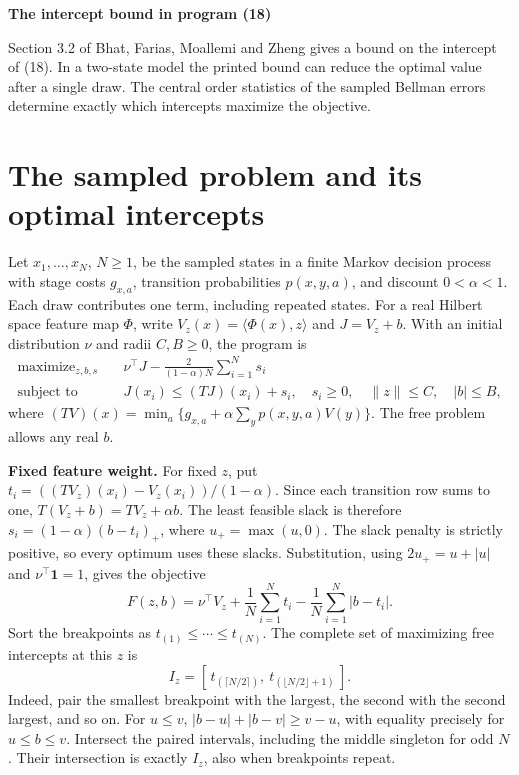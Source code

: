 \documentclass[12pt,a4paper]{article}
\newcommand{\lead}[1]{\par\smallskip\noindent\textbf{#1}\enspace}
\begin{document}
{\LARGE\bfseries The intercept bound in program (18)\par}
\medskip
Section 3.2 of Bhat, Farias, Moallemi and Zheng gives a bound on the
intercept of (18). In a two-state model the printed bound can reduce the
optimal value after a single draw. The central order statistics of the sampled Bellman
errors determine exactly which intercepts maximize the objective.

\section*{The sampled problem and its optimal intercepts}
Let \(x_1,\ldots,x_N\), \(N\ge1\), be the sampled states in a finite Markov
decision process with stage costs \(g_{x,a}\), transition probabilities
\(p(x,y,a)\), and discount \(0<\alpha<1\). Each draw contributes one
term, including repeated states. For a real Hilbert space feature map
\(\Phi\), write \(V_z(x)=\langle\Phi(x),z\rangle\) and \(J=V_z+b\).
With an initial distribution \(\nu\) and radii \(C,B\ge0\), the program is
\begin{equation}
\begin{aligned}
 \operatorname{maximize}_{z,b,s}\quad &\nu^\top J-\frac{2}{(1-\alpha)N}\sum_{i=1}^N s_i\\
 \text{subject to}\quad &J(x_i)\le (TJ)(x_i)+s_i,\quad s_i\ge0,\quad
 \|z\|\le C,\quad |b|\le B,
\end{aligned}\tag{18}
\end{equation}
where \((TV)(x)=\min_a\{g_{x,a}+\alpha\sum_y p(x,y,a)V(y)\}\).
The free problem allows any real \(b\).

\lead{Fixed feature weight.}
For fixed \(z\), put \(t_i=((TV_z)(x_i)-V_z(x_i))/(1-\alpha)\).
Since each transition row sums to one, \(T(V_z+b)=TV_z+\alpha b\).
The least feasible slack is therefore \(s_i=(1-\alpha)(b-t_i)_+\),
where \(u_+=\max(u,0)\). The slack penalty is strictly positive,
so every optimum uses these slacks. Substitution, using
\(2u_+=u+|u|\) and \(\nu^\top\mathbf 1=1\), gives the objective
\[
 F(z,b)=\nu^\top V_z+\frac1N\sum_{i=1}^Nt_i
                   -\frac1N\sum_{i=1}^N|b-t_i|.
\]
Sort the breakpoints as \(t_{(1)}\le\cdots\le t_{(N)}\). The complete
set of maximizing free intercepts at this \(z\) is
\[
 I_z=[\,t_{(\lceil N/2\rceil)},\ t_{(\lfloor N/2\rfloor+1)}\,].
\]
Indeed, pair the smallest breakpoint with the largest, the second
with the second largest, and so on. For \(u\le v\),
\(|b-u|+|b-v|\ge v-u\), with equality precisely for \(u\le b\le v\).
Intersect the paired intervals, including the middle singleton for odd
\(N\). Their intersection is exactly \(I_z\), also when breakpoints repeat.
\end{document}
